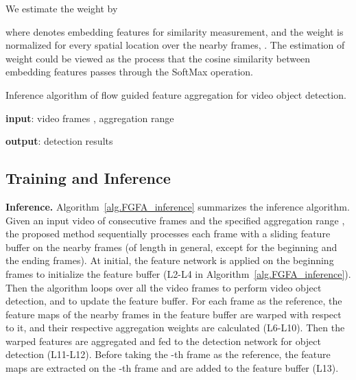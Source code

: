 \documentclass[10pt,twocolumn,letterpaper]{article}
\begin{document}
We estimate the weight by

where  denotes embedding features for similarity measurement, and the weight  is normalized for every spatial location  over the nearby frames, . The estimation of weight could be viewed as the process that the cosine similarity between embedding features passes through the SoftMax operation.

\begin{algorithm}[t]
\caption{Inference algorithm of flow guided feature aggregation for video object detection.}
\small
\begin{algorithmic}[1] \State \textbf{input}: video frames , aggregation range 
                            
\State 
\EndFor

		

		
\State 			{}
\State 	{}
\State 	{}
\EndFor

\State  	{}
\State 		{}

\State 		{}
\EndFor
\State \textbf{output}: detection results 
\end{algorithmic}
\label{alg.FGFA_inference}
\end{algorithm}


\subsection{Training and Inference}

\textbf{Inference.} Algorithm~\ref{alg.FGFA_inference} summarizes the inference algorithm. Given an input video of consecutive frames  and the specified aggregation range , the proposed method sequentially processes each frame with a sliding feature buffer on the nearby frames (of length  in general, except for the beginning and the ending  frames). At initial, the feature network is applied on the beginning  frames to initialize the feature buffer (L2-L4 in Algorithm~\ref{alg.FGFA_inference}). Then the algorithm loops over all the video frames to perform video object detection, and to update the feature buffer. For each frame  as the reference, the feature maps of the nearby frames in the feature buffer are warped with respect to it, and their respective aggregation weights are calculated (L6-L10). Then the warped features are aggregated and fed to the detection network for object detection (L11-L12). Before taking the -th frame as the reference, the feature maps are extracted on the -th frame and are added to the feature buffer (L13).
\end{document}
